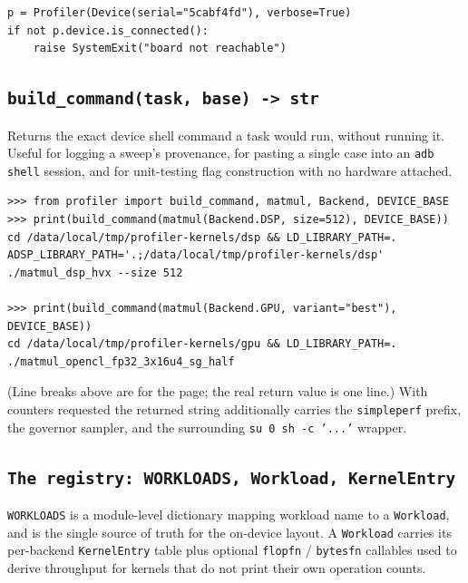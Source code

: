 \documentclass[11pt,a4paper]{article}
\newcommand{\code}[1]{\texttt{\let\_\breakableunderscore #1}}
\newcommand{\breakableunderscore}{\textunderscore\allowbreak}
\newcommand{\apient}[1]{\subsection{\texttt{#1}}}
\begin{document}
\begin{lstlisting}
p = Profiler(Device(serial="5cabf4fd"), verbose=True)
if not p.device.is_connected():
    raise SystemExit("board not reachable")
\end{lstlisting}

\apient{build\_command(task, base) -> str}

Returns the exact device shell command a task would run, without running it.
Useful for logging a sweep's provenance, for pasting a single case into an
\code{adb shell} session, and for unit-testing flag construction with no
hardware attached.

\begin{lstlisting}
>>> from profiler import build_command, matmul, Backend, DEVICE_BASE
>>> print(build_command(matmul(Backend.DSP, size=512), DEVICE_BASE))
cd /data/local/tmp/profiler-kernels/dsp && LD_LIBRARY_PATH=.
ADSP_LIBRARY_PATH='.;/data/local/tmp/profiler-kernels/dsp'
./matmul_dsp_hvx --size 512

>>> print(build_command(matmul(Backend.GPU, variant="best"), DEVICE_BASE))
cd /data/local/tmp/profiler-kernels/gpu && LD_LIBRARY_PATH=.
./matmul_opencl_fp32_3x16u4_sg_half
\end{lstlisting}

\noindent (Line breaks above are for the page; the real return value is one
line.) With counters requested the returned string additionally carries the
\code{simpleperf} prefix, the governor sampler, and the surrounding
\code{su 0 sh -c '...'} wrapper.

\apient{The registry: \texttt{WORKLOADS}, \texttt{Workload}, \texttt{KernelEntry}}
\label{sec:registry}

\code{WORKLOADS} is a module-level dictionary mapping workload name to a
\code{Workload}, and is the single source of truth for the on-device layout. A
\code{Workload} carries its per-backend \code{KernelEntry} table plus optional
\code{flop\_fn} / \code{bytes\_fn} callables used to derive throughput for
kernels that do not print their own operation counts.
\end{document}
